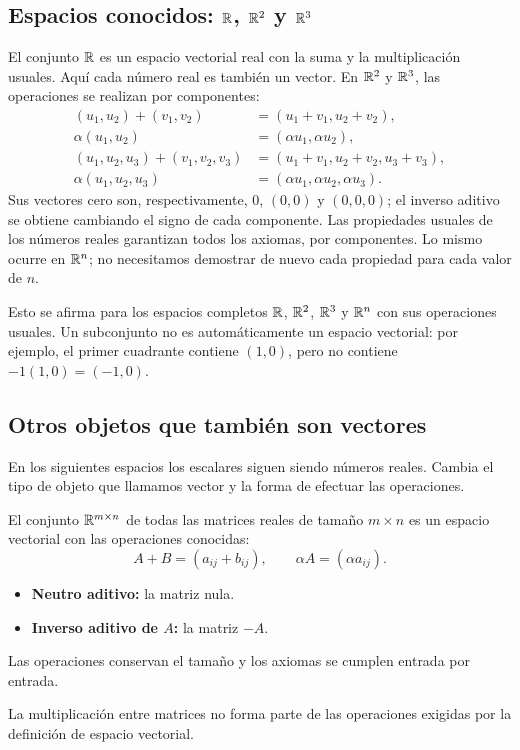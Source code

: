 \documentclass[compacto,10pt]{pubciencias-notas}
\renewenvironment{defi}[1][]
    {\begin{recuadrocti}[nombre=#1,tipo=Definición,contador=defi,
        color=colordef,nobreak=false,needspace=0pt,
        splittopskip=\topskip,splitbottomskip=0pt]}
    {\end{recuadrocti}}
\begin{document}
\subsection{Espacios conocidos: \texorpdfstring{$\R$, $\R^2$ y $\R^3$}{R, R2 y R3}}

\begin{ejem}
    El conjunto $\R$ es un espacio vectorial real con la suma y la
    multiplicación usuales. Aquí cada número real es también un vector.
    En $\R^2$ y $\R^3$, las operaciones se realizan por componentes:
    \begin{align*}
        (u_1,u_2)+(v_1,v_2)&=(u_1+v_1,u_2+v_2),\\
        \alpha(u_1,u_2)&=(\alpha u_1,\alpha u_2),\\
        (u_1,u_2,u_3)+(v_1,v_2,v_3)&=(u_1+v_1,u_2+v_2,u_3+v_3),\\
        \alpha(u_1,u_2,u_3)&=(\alpha u_1,\alpha u_2,\alpha u_3).
    \end{align*}
    Sus vectores cero son, respectivamente, $0$, $(0,0)$ y $(0,0,0)$;
    el inverso aditivo se obtiene cambiando el signo de cada componente.
    Las propiedades usuales de los números reales garantizan todos los
    axiomas, por componentes. Lo mismo ocurre en $\R^n$; no necesitamos
    demostrar de nuevo cada propiedad para cada valor de $n$.
\end{ejem}

\begin{advertencia}
    Esto se afirma para los espacios completos $\R$, $\R^2$, $\R^3$ y
    $\R^n$ con sus operaciones usuales. Un subconjunto no es automáticamente
    un espacio vectorial: por ejemplo, el primer cuadrante contiene $(1,0)$,
    pero no contiene $-1(1,0)=(-1,0)$.
\end{advertencia}

\subsection{Otros objetos que también son vectores}

En los siguientes espacios los escalares siguen siendo números reales.
Cambia el tipo de objeto que llamamos vector y la forma de efectuar las
operaciones.

\begin{defi}[Espacio de matrices reales]
    El conjunto $\Mat[\R]{m}{n}$ de todas las matrices reales de tamaño
    $m\times n$ es un espacio vectorial con las operaciones conocidas:
    \[
        A+B=(a_{ij}+b_{ij}),\qquad \alpha A=(\alpha a_{ij}).
    \]
    \begin{itemize}
        \item \textbf{Neutro aditivo:} la matriz nula.
        \item \textbf{Inverso aditivo de $A$:} la matriz $-A$.
    \end{itemize}
    Las operaciones conservan el tamaño y los axiomas se cumplen entrada
    por entrada. 
\end{defi}
\begin{advertencia}
La multiplicación entre matrices no forma parte de las
    operaciones exigidas por la definición de espacio vectorial.    
\end{advertencia}
\end{document}
